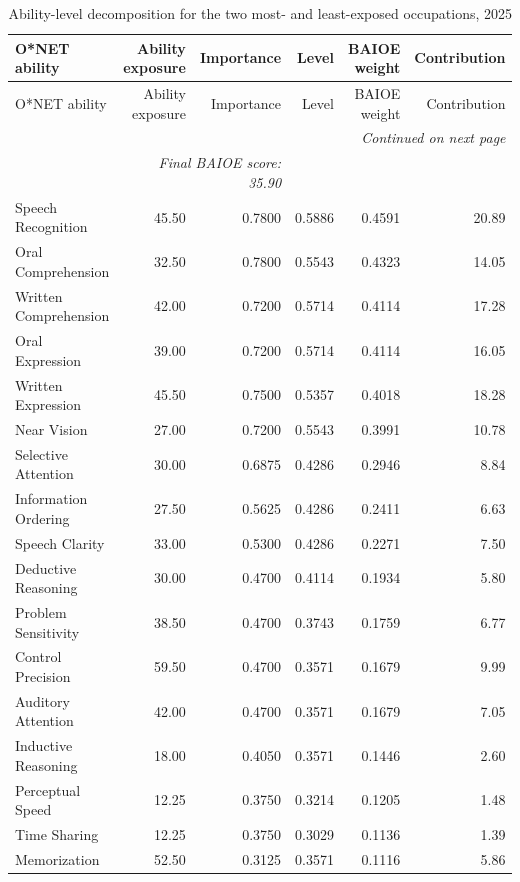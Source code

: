 \begin{longtable}{lrrrrr}
\caption{Ability-level decomposition for the two most- and least-exposed occupations, 2025}\label{tab:decomp} \\ \toprule
O*NET ability & Ability exposure & Importance & Level & BAIOE weight & Contribution \\ \midrule \endfirsthead
\toprule O*NET ability & Ability exposure & Importance & Level & BAIOE weight & Contribution \\ \midrule \endhead
\midrule \multicolumn{6}{r}{\textit{Continued on next page}} \\ \endfoot
\bottomrule \endlastfoot
\multicolumn{4}{l}{\textit{Highest exposure: Court Reporters and Simultaneous Captioners}} & \multicolumn{2}{r}{\textit{Final BAIOE score: 35.90}} \\
Speech Recognition & 45.50 & 0.7800 & 0.5886 & 0.4591 & 20.89 \\
Oral Comprehension & 32.50 & 0.7800 & 0.5543 & 0.4323 & 14.05 \\
Written Comprehension & 42.00 & 0.7200 & 0.5714 & 0.4114 & 17.28 \\
Oral Expression & 39.00 & 0.7200 & 0.5714 & 0.4114 & 16.05 \\
Written Expression & 45.50 & 0.7500 & 0.5357 & 0.4018 & 18.28 \\
Near Vision & 27.00 & 0.7200 & 0.5543 & 0.3991 & 10.78 \\
Selective Attention & 30.00 & 0.6875 & 0.4286 & 0.2946 & 8.84 \\
Information Ordering & 27.50 & 0.5625 & 0.4286 & 0.2411 & 6.63 \\
Speech Clarity & 33.00 & 0.5300 & 0.4286 & 0.2271 & 7.50 \\
Deductive Reasoning & 30.00 & 0.4700 & 0.4114 & 0.1934 & 5.80 \\
Problem Sensitivity & 38.50 & 0.4700 & 0.3743 & 0.1759 & 6.77 \\
Control Precision & 59.50 & 0.4700 & 0.3571 & 0.1679 & 9.99 \\
Auditory Attention & 42.00 & 0.4700 & 0.3571 & 0.1679 & 7.05 \\
Inductive Reasoning & 18.00 & 0.4050 & 0.3571 & 0.1446 & 2.60 \\
Perceptual Speed & 12.25 & 0.3750 & 0.3214 & 0.1205 & 1.48 \\
Time Sharing & 12.25 & 0.3750 & 0.3029 & 0.1136 & 1.39 \\
Memorization & 52.50 & 0.3125 & 0.3571 & 0.1116 & 5.86 \\

\end{longtable}
